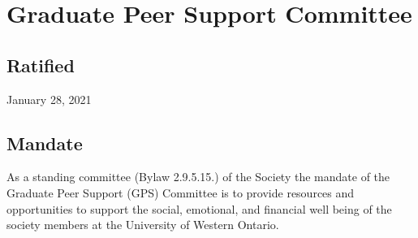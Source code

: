 \section{Graduate Peer Support Committee}

\subsection{Ratified}
January 28, 2021

\subsection{Mandate}
As a standing committee (Bylaw 2.9.5.15.) of the Society the mandate of the Graduate Peer Support (GPS) Committee is to provide resources and opportunities to support the social, emotional, and financial well being of the society members at the University of Western Ontario.

